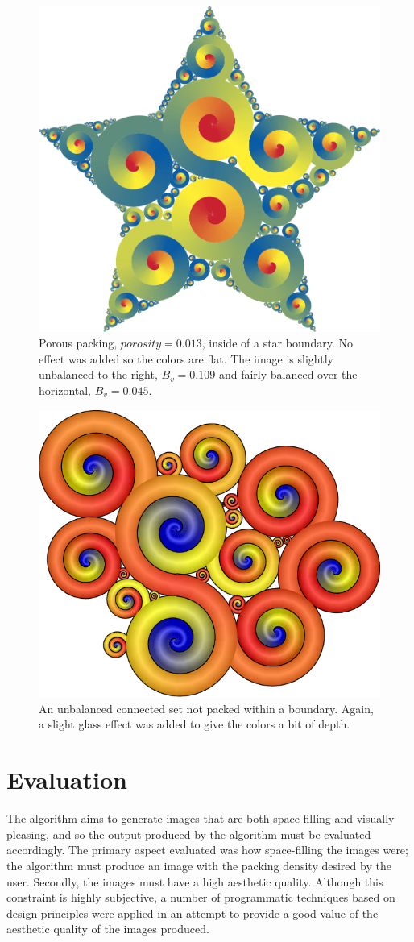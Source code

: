 \documentclass[11pt]{IEEEtran}
\begin{document}
\begin{figure}[h]
\centering \includegraphics[width=0.75\linewidth]{star2}
\caption{Porous packing, $porosity = 0.013$, inside of a star boundary. No effect was added so the colors are flat. The image is slightly unbalanced to the right, $B_{v} = 0.109$ and fairly balanced over the horizontal, $B_{v} = 0.045$.}
\label{fig:star}
\end{figure}

\begin{figure}[h]
\centering \includegraphics[width=0.75\linewidth]{noboundary}
\caption{An unbalanced connected set not packed within a boundary. Again, a slight glass effect was added to give the colors a bit of depth.}
\label{fig:nob}
\end{figure}

\label{results}

\section{Evaluation}
The algorithm aims to generate images that are both space-filling and visually pleasing, and so the output produced by the algorithm must be evaluated accordingly. The primary aspect evaluated was how space-filling the images were; the algorithm must produce an image with the packing density desired by the user. Secondly, the images must have a high aesthetic quality. Although this constraint is highly subjective, a number of programmatic techniques based on design principles were applied in an attempt to provide a good value of the aesthetic quality of the images produced.
\end{document}
